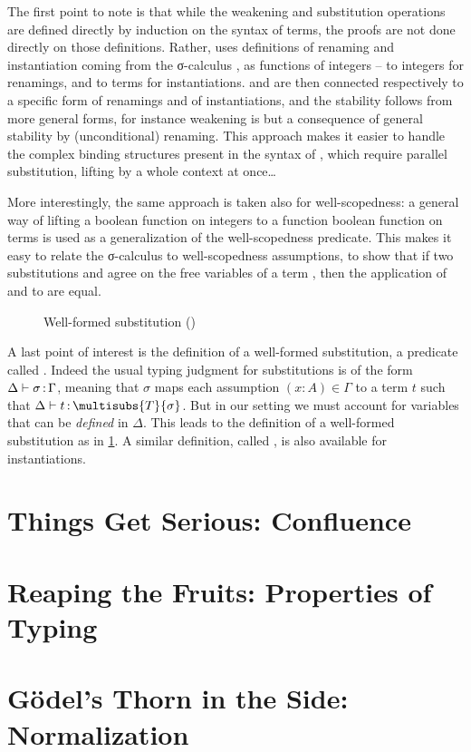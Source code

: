 The first point to note is that while the weakening and substitution operations are defined
directly by induction on the syntax of terms, the proofs are not done directly
on those definitions. Rather,  uses definitions of renaming and instantiation coming
from the σ-calculus , as functions of integers – to integers for
renamings, and to terms for instantiations.  and  are then connected
respectively to a specific form of renamings and of instantiations, and the stability follows from
more general forms, for instance weakening is but a consequence of general stability by
(unconditional) renaming. This approach makes it easier to handle the complex binding structures
present in the syntax of , which require parallel substitution, lifting by a whole context
at once…

More interestingly, the same approach is taken also for well-scopedness: a general way of lifting
a boolean function on integers to a function boolean function
on terms
is used as a generalization of the well-scopedness predicate.
This makes it easy to relate the σ-calculus
to well-scopedness assumptions, \eg to show that if two substitutions  and 
agree on the free variables of a term , then the application of  and 
to  are equal.

\begin{figure}[h]
  \caption{Well-formed substitution ()}
  \label{fig:meta-subslet}
\end{figure}

A last point of interest is the definition of a well-formed substitution, a predicate called
. Indeed the usual typing judgment for substitutions
is of the form $\Delta \vdash \sigma \operatorname{\mathrel{:}} \Gamma$, meaning that
$\sigma$ maps each assumption $(x : A) \in \Gamma$ to a term $t$ such that
$\Delta \vdash t \ty \multisubs{T}{\sigma}$. But in our setting we must account for variables
that can be \emph{defined} in $\Delta$. This leads to the definition of a well-formed substitution as in \cref{fig:meta-subslet}.
A similar definition, called , is also available for
instantiations.

\section[Confluence]{Things Get Serious: Confluence}
\label{sec:pcuic-confluence}


\section[Properties of Typing]{Reaping the Fruits: Properties of Typing}
\label{sec:meta-typing-prop}

\section[Normalization]{Gödel’s Thorn in the Side: Normalization}
\label{sec:meta-normalization}